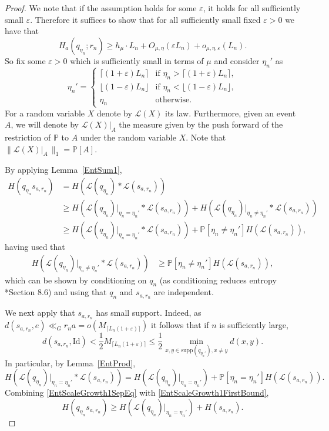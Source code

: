 \documentclass[10pt, english,oneside,reqno]{amsart}
\theoremstyle{plain}
\theoremstyle{remark}
\numberwithin{equation}{section}
\numberwithin{figure}{section}
\newcommand{\eps}{\varepsilon}
\newcommand{\Prob}{\mathbb{P}}
\begin{document}
\begin{proof}
    We note that if the assumption holds for some $\eps$, it holds for all sufficiently small $\eps$. Therefore it suffices to show that for all sufficiently small fixed $\eps > 0$ we have that $$H_a(q_{\eta_{n}} ; r_n) \geq h_{\mu}\cdot L_n + O_{\mu,\eta}(\eps L_n) + o_{\mu,\eta,\eps}(L_n).$$ So fix some $\eps > 0$ which is sufficiently small in terms of  $\mu$ and consider $\eta_n'$ as $$\eta_n' = \begin{cases}
        \lceil (1 + \eps) L_n \rceil & \text{if } \eta_n > \lceil (1 + \eps) L_n \rceil, \\
        \lfloor (1 - \eps) L_n \rfloor & \text{if } \eta_n < \lfloor (1 - \eps) L_n \rfloor, \\
        \eta_n & \text{otherwise}.
    \end{cases}$$
    For a random variable $X$ denote by $\mathcal{L}(X)$ its law. Furthermore, given an event $A$, we will denote by $\mathcal{L}(X)|_A$ the measure given by the push forward of the restriction of $\mathbb{P}$ to $A$ under the random variable $X$. Note that $\|\mathcal{L}(X)|_A\,\|_1 = \mathbb{P}[A]$.

    By applying Lemma~\ref{EntSum1}, 
    \begin{align}
        H(q_{\eta_n}s_{a, r_n}) &= H(\mathcal{L}(q_{\eta_n}) * \mathcal{L}(s_{a, r_n})) \nonumber \\
        &\geq H(\mathcal{L}(q_{\eta_n})|_{\eta_n = \eta_n'} * \mathcal{L}(s_{a, r_n}))  + H(\mathcal{L}(q_{\eta_n})|_{\eta_n \neq \eta_n'} * \mathcal{L}(s_{a, r_n})) \nonumber \\
        &\geq H(\mathcal{L}(q_{\eta_n})|_{\eta_n = \eta_n'} * \mathcal{L}(s_{a, r_n})) + \mathbb{P}[\eta_n \neq \eta_n']H(\mathcal{L}(s_{a, r_n})), \label{EntScaleGrowth1FirstBound}
    \end{align} having used that  
    \begin{align*}
        H(\mathcal{L}(q_{\eta_n})|_{\eta_n \neq \eta_n'} * \mathcal{L}(s_{a, r_n}))  &\geq \mathbb{P}[\eta_n \neq \eta_n']H(\mathcal{L}(s_{a, r_n})),
    \end{align*} which can be shown by conditioning on $q_n$ (as conditioning reduces entropy \cite{CoverThomasBook}*{Section 8.6}) and using that $q_n$ and $s_{a,r_n}$ are independent.

    We next apply that $s_{a, r_n}$ has small support. Indeed, as $d(s_{a, r_n}, e) \ll_G r_na = o(M_{\lceil L_n(1 + \eps) \rceil})$ it follows that if $n$ is sufficiently large, $$d(s_{a, r_n}, \mathrm{Id}) <  \frac{1}{2}M_{\lceil L_n(1 + \eps) \rceil} \leq  \frac{1}{2}  \min_{x,y \in \mathrm{supp}(q_{\eta_n'}), x \neq y} d(x,y).$$ In particular, by Lemma~\ref{EntProd}, 
    \begin{equation}\label{EntScaleGrowth1SepEq}
        H(\mathcal{L}(q_{\eta_n})|_{\eta_n = \eta_n'} * \mathcal{L}(s_{a, r_n})) = H(\mathcal{L}(q_{\eta_n})|_{\eta_n = \eta_n'}) + \Prob[\eta_n = \eta_n'] H(\mathcal{L}(s_{a, r_n})).
    \end{equation}
    Combining \eqref{EntScaleGrowth1SepEq} with \eqref{EntScaleGrowth1FirstBound},  
    $$H(q_{\eta_n}s_{a, r_n}) \geq H(\mathcal{L}(q_{\eta_n})|_{\eta_n = \eta_n'}) + H(s_{a, r_n}).$$


\end{proof}
\end{document}
